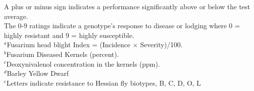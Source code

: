 \documentclass[12pt, letterpaper]{article}
\begin{document}
\begin{landscape}
\begin{table}[ht]
\raggedright{
\footnotesize
A plus or minus sign indicates a performance significantly above or below the test average.\\
The 0-9 ratings indicate a genotype's response to disease or lodging where 0 = highly resistant and 9 = highly susceptible.\\
$^a$Fusarium head blight Index = (Incidence $\times$ Severity)/100. \\
$^b$Fusarium Diseased Kernels (percent). \\
$^c$Deoxynivalenol concentration in the kernels (ppm). \\
$^d$Barley Yellow Dwarf \\
$^e$Letters indicate resistance to Hessian fly biotypes, B, C, D, O, L} 
\end{table}

\newpage


\end{landscape}
\end{document}
